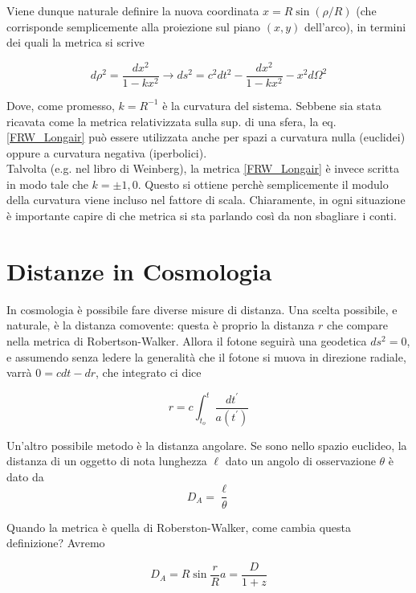 \documentclass{report}
\begin{document}
Viene dunque naturale definire la nuova coordinata $x = R\sin(\rho/R)$ (che corrisponde semplicemente alla proiezione sul piano $(x,y)$ dell'arco), in termini dei quali la metrica si scrive 

\begin{equation}
    \label{FRW_Longair}
    d\rho^2 = \frac{dx^2}{1-kx^2} \rightarrow ds^2 = c^2dt^2 - \frac{dx^2}{1-kx^2} -x^2d\Omega^2 
\end{equation}

Dove, come promesso, $k= R^{-1}$ è la curvatura del sistema. Sebbene sia stata ricavata come la metrica relativizzata sulla sup. di una sfera, la eq. \ref{FRW_Longair} può essere utilizzata anche per spazi a curvatura nulla (euclidei) oppure a curvatura negativa (iperbolici). \\

Talvolta (e.g. nel libro di Weinberg), la metrica \ref{FRW_Longair} è invece scritta in modo tale che $k= \pm1, 0$. Questo si ottiene perchè semplicemente il modulo della curvatura viene incluso nel fattore di scala. Chiaramente, in ogni situazione è importante capire di che metrica si sta parlando così da non sbagliare i conti. 

\section{Distanze in Cosmologia}

In cosmologia è possibile fare diverse misure di distanza. Una scelta possibile, e naturale, è la distanza comovente: questa è proprio la distanza $r$ che compare nella metrica di Robertson-Walker. Allora il fotone seguirà una geodetica $ds^2 = 0$, e assumendo senza ledere la generalità che il fotone si muova in direzione radiale, varrà $0 = cdt - dr$, che integrato ci dice 

\begin{equation}
    r = c\int_{t_o}^t\frac{dt^{'}}{a(t^{'})}
\end{equation}


Un'altro possibile metodo è la distanza angolare. Se sono nello spazio euclideo, la distanza di un oggetto di nota lunghezza $\ell$ dato un angolo di osservazione $\theta$ è dato da
\begin{equation}
    D_A = \frac{\ell}{\theta}
\end{equation}

Quando la metrica è quella di Roberston-Walker, come cambia questa definizione? Avremo

\begin{equation}
    D_A = R\sin{\frac{r}{R}}a = \frac{D}{1+z}
\end{equation}
\end{document}

